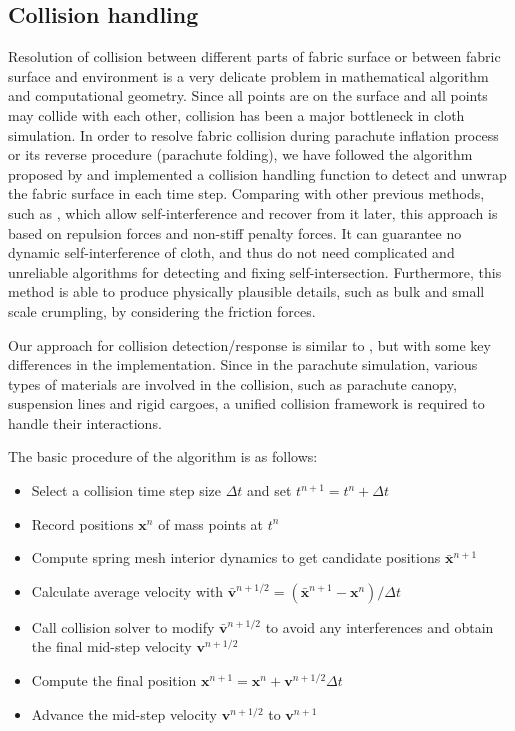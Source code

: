 \subsection{Collision handling}
Resolution of collision between different parts of
fabric surface or between fabric surface and environment is a very delicate
problem in mathematical algorithm and computational geometry. Since all points 
are on the surface and all points may collide with each other, collision has been 
a major bottleneck in cloth simulation. In order to resolve fabric collision during parachute inflation process or its reverse procedure (parachute folding), we have followed the algorithm proposed by \cite{BridsonRobust2002} and implemented a collision handling function to detect and unwrap the fabric surface in each time step. Comparing with other previous methods, such as \cite{Provot1997, Volino1995}, which allow self-interference and recover from it later, this approach is based on repulsion forces and non-stiff penalty forces. It can guarantee no dynamic self-interference of cloth, and thus do not need complicated and unreliable algorithms for detecting and fixing self-intersection. Furthermore, this method is able to produce physically plausible details, such as bulk and small scale crumpling, by considering the friction forces.

Our approach for collision detection/response is similar to \cite{BridsonRobust2002}, but with some key differences in the implementation. Since in the parachute simulation, various types of materials are involved in the collision, such as parachute canopy, suspension lines and rigid cargoes, a unified collision framework is required to handle their interactions. 
 
The basic procedure of the algorithm is as follows:
\begin{itemize}
\item Select a collision time step size $\Delta t$ and set $t^{n+1}=t^{n}+\Delta t$
\item Record positions $\mathbf{x}^n$ of mass points at $t^n$
\item Compute spring mesh interior dynamics to get candidate positions
$\bar{\mathbf{x}}^{n+1}$
\item Calculate average velocity with
$\bar{\mathbf{v}}^{n+1/2} = (\bar{\mathbf{x}}^{n+1}-\mathbf{x}^n)/\Delta t$
\item Call collision solver to modify $\bar{\mathbf{v}}^{n+1/2}$ to avoid any interferences and obtain the final mid-step velocity $\mathbf{v}^{n+1/2}$
\item Compute the final position
$\mathbf{x}^{n+1} = \mathbf{x}^n+\mathbf{v}^{n+1/2}\Delta t$
\item Advance the mid-step velocity $\mathbf{v}^{n+1/2}$ to $\mathbf{v}^{n+1}$ \end{itemize}

